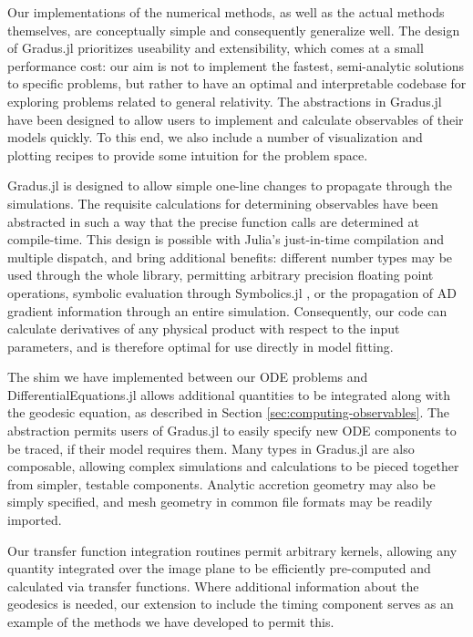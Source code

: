 \documentclass[fleqn,usenatbib]{mnras}
\newcommand{\Gradus}{Gradus.jl }
\begin{document}
Our implementations of the numerical methods, as well as the actual methods themselves, are conceptually simple and consequently generalize well. The design of \Gradus prioritizes useability and extensibility, which comes at a small performance cost: our aim is not to implement the fastest, semi-analytic solutions to specific problems, but rather to have an optimal and interpretable codebase for exploring problems related to general relativity. The abstractions in \Gradus have been designed to allow users to implement and calculate observables of their models quickly. To this end, we also include a number of visualization and plotting recipes to provide some intuition for the problem space.

\Gradus is designed to allow simple one-line changes to propagate through the simulations. The requisite calculations for determining observables have been abstracted in such a way that the precise function calls are determined at compile-time. This design is possible with Julia's just-in-time compilation and multiple dispatch, and bring additional benefits: different number types may be used through the whole library, permitting arbitrary precision floating point operations, symbolic evaluation through Symbolics.jl \citep{symbolics_julia}, or the propagation of AD gradient information through an entire simulation. Consequently, our code can calculate derivatives of any physical product with respect to the input parameters, and is therefore optimal for use directly in model fitting.

The shim we have implemented between our ODE problems and DifferentialEquations.jl allows additional quantities to be integrated along with the geodesic equation, as described in Section \ref{sec:computing-observables}. The abstraction permits users of \Gradus to easily specify new ODE components to be traced, if their model requires them. Many types in \Gradus are also composable, allowing complex simulations and calculations to be pieced together from simpler, testable components. Analytic accretion geometry may also be simply specified, and mesh geometry in common file formats may be readily imported.

Our transfer function integration routines permit arbitrary kernels, allowing any quantity integrated over the image plane to be efficiently pre-computed and calculated via transfer functions. Where additional information about the geodesics is needed, our extension to include the timing component serves as an example of the methods we have developed to permit this.
\end{document}
